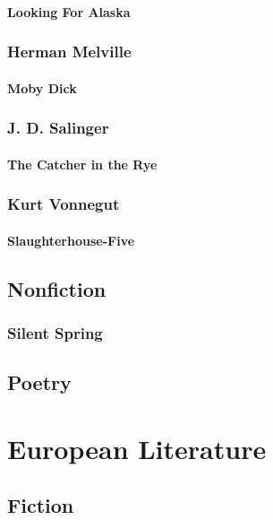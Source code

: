 			\paragraph{Looking For Alaska}
			
			\subsubsection{Herman Melville}
			\paragraph{Moby Dick}
			
			
			\subsubsection{J. D. Salinger}
			\paragraph{The Catcher in the Rye}
			
			
			\subsubsection{Kurt Vonnegut}
			\paragraph{Slaughterhouse-Five}			

			

			

			
			
		\subsection{Nonfiction}
			\subsubsection{Silent Spring}
		\subsection{Poetry}

			

		
	\section{European Literature}
		\subsection{Fiction}
